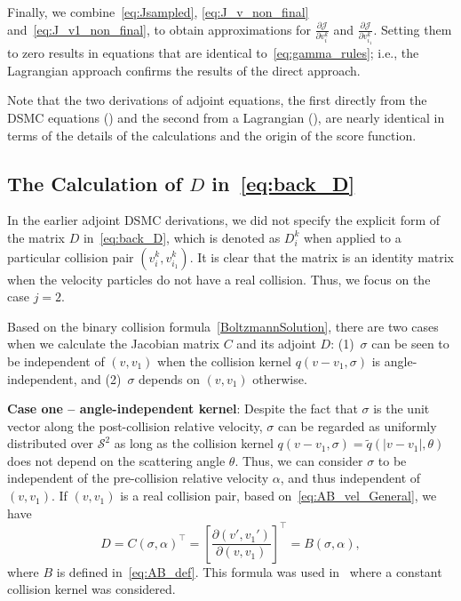 \documentclass[12pt,nopreprintline]{elsarticle}
\newcommand{\cS}{\mathcal S} \newcommand{\cT}{\mathcal T}
\newcommand{\Stwo}{{\cS^2}}
\begin{document}
Finally, we combine~\eqref{eq:Jsampled}, \eqref{eq:J_v_non_final} and~\eqref{eq:J_v1_non_final}, to obtain approximations for $\frac{\partial \mathcal{J}}{\partial v^k_{i}}$ and $\frac{\partial \mathcal{J}}{\partial v^k_{i_1}}$. Setting them to zero results in equations that are identical to~\eqref{eq:gamma_rules}; i.e., the Lagrangian approach confirms the results of the direct approach.

Note that the two derivations of adjoint equations, the first directly from the DSMC equations () and the second from a Lagrangian (), are nearly identical in terms of the details of the calculations and the origin of the score function.


\subsection{The Calculation of $D$ in~\eqref{eq:back_D}} \label{subsec:discuss D}
In the earlier adjoint DSMC derivations, we did not specify the explicit form of the matrix $D$ in~\eqref{eq:back_D}, which is denoted as $D_i^k$ when applied to a particular collision pair $(v_i^k, v_{i_1}^k)$. It is clear that the matrix is an identity matrix when the velocity particles do not have a real collision. Thus, we focus on the case $j=2$.

Based on the binary collision formula~\eqref{BoltzmannSolution}, there are two cases when we calculate the Jacobian matrix $C$ and its adjoint $D$: (1)~$\sigma$ can be seen to be independent of $(v,v_1)$ when the collision kernel $q(v-v_1, \sigma)$ is angle-independent, and (2)~$\sigma$ depends on $(v,v_1)$ otherwise.


\textbf{Case one -- angle-independent kernel}: Despite the fact that $\sigma$ is the unit vector along the post-collision relative velocity, $\sigma$ can be regarded as uniformly distributed over $\Stwo$ as long as the collision kernel $q(v-v_1, \sigma) = \tilde q(|v-v_1|, \theta) $ does not depend on the scattering angle $\theta$. Thus, we can consider $\sigma$ to be independent of the pre-collision relative velocity $\alpha$, and thus independent of $(v,v_1)$. If $(v,v_1)$ is a real collision pair, based on~\eqref{eq:AB_vel_General}, we have
\begin{equation} \label{eq:D angle-independent}
   D =   C(\sigma,\alpha)^\top =  \left[\dfrac{\partial (v',v_1')}{\partial (v,v_1)} \right]^\top = B(\sigma,\alpha),
\end{equation}
where $B$ is defined in~\eqref{eq:AB_def}. This formula was used in~\cite{caflisch2021adjoint} where a constant collision kernel was considered.
\end{document}
